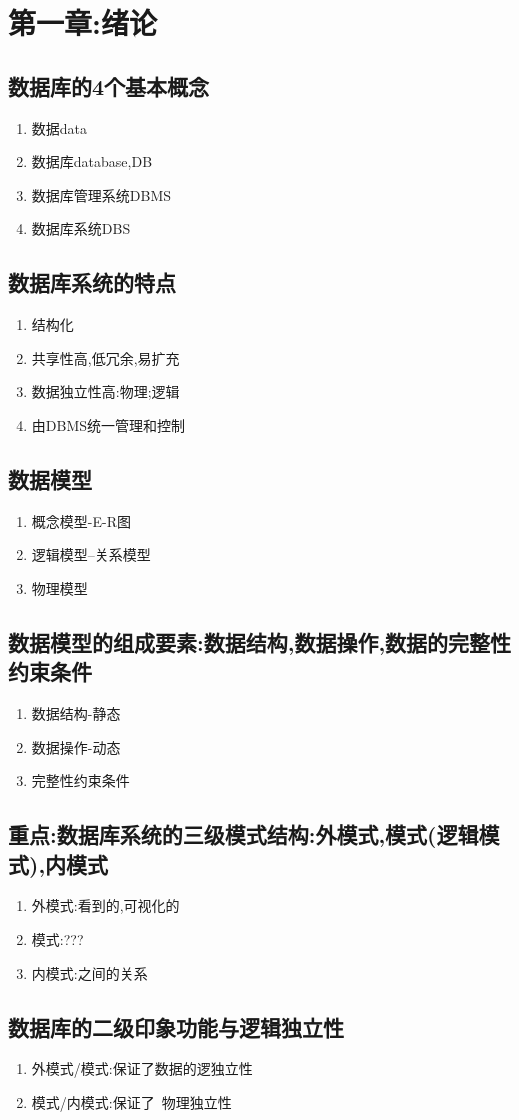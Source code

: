 

\section{第一章:绪论}

\subsection{数据库的4个基本概念}
\begin{enumerate}
    \item 数据data
    \item 数据库database,DB
    \item 数据库管理系统DBMS
    \item 数据库系统DBS
\end{enumerate}
\subsection{数据库系统的特点}
\begin{enumerate}
    \item 结构化
    \item 共享性高,低冗余,易扩充
    \item 数据独立性高:物理;逻辑
    \item 由DBMS统一管理和控制
\end{enumerate}
\subsection{数据模型}
\begin{enumerate}
    \item 概念模型-E-R图
    \item 逻辑模型--关系模型
    \item 物理模型
\end{enumerate}
\subsection{数据模型的组成要素:数据结构,数据操作,数据的完整性约束条件}
\begin{enumerate}
    \item 数据结构-静态
    \item 数据操作-动态
    \item 完整性约束条件
\end{enumerate}
\subsection{\texorpdfstring{\color{red}\textbf{重点:数据库系统的三级模式结构:外模式,模式(逻辑模式),内模式}}{重点:数据库系统的三级模式结构:外模式,模式(逻辑模式),内模式}}
\begin{enumerate}
    \item 外模式:看到的,可视化的
    \item 模式:???
    \item 内模式:之间的关系
\end{enumerate}
\subsection{数据库的二级印象功能与逻辑独立性}
\begin{enumerate}
    \item 外模式/模式:保证了数据的逻独立性
    \item 模式/内模式:保证了~物理独立性
\end{enumerate}
